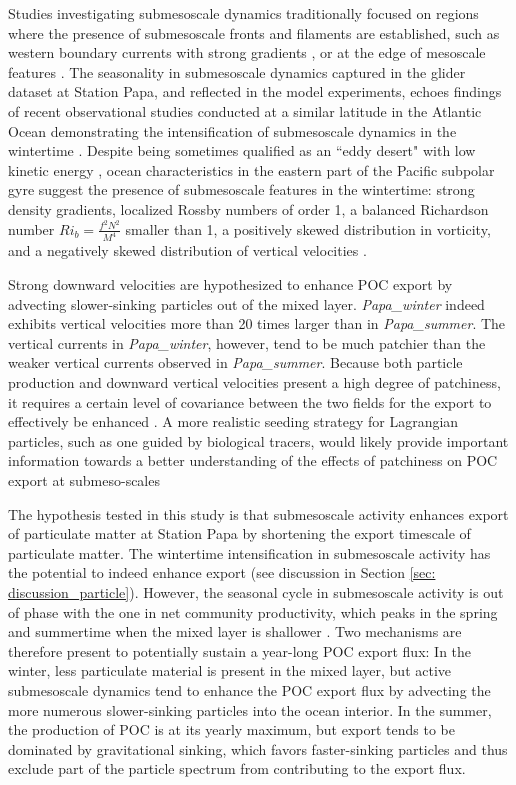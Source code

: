 \documentclass[draft,linenumbers]{agujournal2018}
\begin{document}
Studies investigating submesoscale dynamics traditionally focused on regions where the presence of submesoscale fronts and filaments are established, such as western boundary currents with strong gradients \citep{Dasaro_2011, Thomas_2013}, or at the edge of mesoscale features \citep{vanHaren_2006,Waite_2016}. The seasonality in submesoscale dynamics captured in the glider dataset at Station Papa, and reflected in the model experiments, echoes findings of recent observational studies conducted at a similar latitude in the Atlantic Ocean demonstrating the intensification of submesoscale dynamics in the wintertime \citep{Thompson_2016, Buckingham_2016}. Despite being sometimes qualified as an ``eddy desert" with low kinetic energy \citep{Chelton_2011}, ocean characteristics in the eastern part of the Pacific subpolar gyre suggest the presence of submesoscale features in the wintertime: strong density gradients, localized Rossby numbers of order 1, a balanced Richardson number $Ri_b = \frac{f^2N^2}{M^4}$ smaller than 1, a positively skewed distribution in vorticity, and a negatively skewed distribution of vertical velocities \citep[see Figure \ref{fig: dynamics};][]{Thomas_2008,Rudnick_2001, Buckingham_2016}.

Strong downward velocities are hypothesized to enhance POC export by advecting slower-sinking particles out of the mixed layer. \textit{Papa\_winter} indeed exhibits vertical velocities more than 20 times larger than in \textit{Papa\_summer}. The vertical currents in \textit{Papa\_winter}, however, tend to be much patchier than the weaker vertical currents observed in \textit{Papa\_summer}. Because both particle production and downward vertical velocities present a high degree of patchiness, it requires a certain level of covariance between the two fields for the export to effectively be enhanced \citep{Mahadevan_2012}. A more realistic seeding strategy for Lagrangian particles, such as one guided by biological tracers, would likely provide important information towards a better understanding of the effects of patchiness on POC export at submeso-scales

The hypothesis tested in this study is that submesoscale activity enhances export of particulate matter at Station Papa by shortening the export timescale of particulate matter. The wintertime intensification in submesoscale activity has the potential to indeed enhance export (see discussion in Section \ref{sec: discussion_particle}). However, the seasonal cycle in submesoscale activity is out of phase with the one in net community productivity, which peaks in the spring and summertime when the mixed layer is shallower \citep{Plant_2016}. Two mechanisms are therefore present to potentially sustain a year-long POC export flux: In the winter, less particulate material is present in the mixed layer, but active submesoscale dynamics tend to enhance the POC export flux by advecting the more numerous slower-sinking particles into the ocean interior. In the summer, the production of POC is at its yearly maximum, but export tends to be dominated by gravitational sinking, which favors faster-sinking particles and thus exclude part of the particle spectrum from contributing to the export flux.
\end{document}
